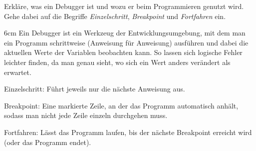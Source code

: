 
\question[4]
Erkläre, was ein Debugger ist und wozu er beim Programmieren genutzt wird. 
Gehe dabei auf die Begriffe \emph{Einzelschritt}, \emph{Breakpoint} und \emph{Fortfahren} ein.

\begin{solutionbox}{6cm}
Ein Debugger ist ein Werkzeug der Entwicklungsumgebung, mit dem
man ein Programm schrittweise (Anweisung für Anweisung) ausführen
und dabei die aktuellen Werte der Variablen beobachten kann.
So lassen sich logische Fehler leichter finden, da man genau
sieht, wo sich ein Wert anders verändert als erwartet.

Einzelschritt: Führt jeweils nur die nächste Anweisung aus.

Breakpoint: Eine markierte Zeile, an der das Programm automatisch
anhält, sodass man nicht jede Zeile einzeln durchgehen muss.

Fortfahren: Lässt das Programm laufen, bis der nächste Breakpoint
erreicht wird (oder das Programm endet).
\end{solutionbox}